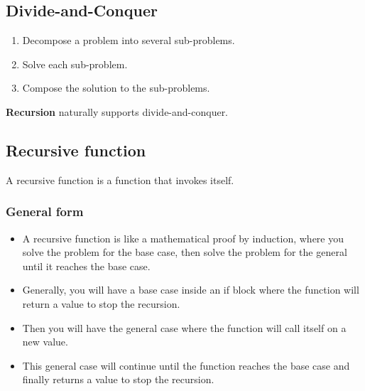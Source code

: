 \documentclass[11pt]{article}
\begin{document}
\subsection{Divide-and-Conquer}
\label{sec:org4365ceb}
\begin{enumerate}
\item Decompose a problem into several sub-problems.
\item Solve each sub-problem.
\item Compose the solution to the sub-problems.
\end{enumerate}

\textbf{Recursion} naturally supports divide-and-conquer.

\subsection{Recursive function}
\label{sec:orgb9c115c}
A recursive function is a function that invokes itself.

\subsubsection{General form}
\label{sec:org04a59e1}
\begin{itemize}
\item A recursive function is like a mathematical proof by induction, where you solve the problem for the base case, then solve the problem for the general until it reaches the base case.
\item Generally, you will have a base case inside an if block where the function will return a value to stop the recursion.
\item Then you will have the general case where the function will call itself on a new value.
\item This general case will continue until the function reaches the base case and finally returns a value to stop the recursion.
\end{itemize}
\end{document}
